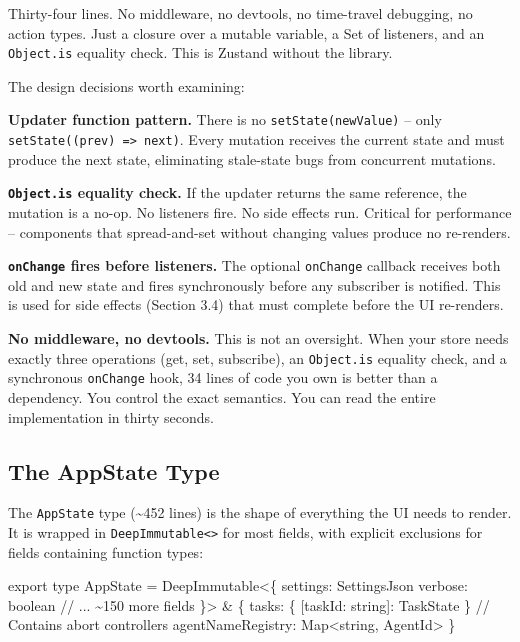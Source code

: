 \documentclass[
  english,
  11pt,
  letterpaper,
]{book}
\newenvironment{Shaded}{\begin{snugshade}}{\end{snugshade}}
\newcommand{\BuiltInTok}[1]{\textcolor[rgb]{0.00,0.23,0.31}{#1}}
\newcommand{\CommentTok}[1]{\textcolor[rgb]{0.37,0.37,0.37}{#1}}
\newcommand{\DataTypeTok}[1]{\textcolor[rgb]{0.68,0.00,0.00}{#1}}
\newcommand{\ImportTok}[1]{\textcolor[rgb]{0.00,0.46,0.62}{#1}}
\newcommand{\NormalTok}[1]{\textcolor[rgb]{0.00,0.23,0.31}{#1}}
\newcommand{\OperatorTok}[1]{\textcolor[rgb]{0.37,0.37,0.37}{#1}}
\begin{document}
Thirty-four lines. No middleware, no devtools, no time-travel debugging,
no action types. Just a closure over a mutable variable, a Set of
listeners, and an \texttt{Object.is} equality check. This is Zustand
without the library.

The design decisions worth examining:

\textbf{Updater function pattern.} There is no
\texttt{setState(newValue)} -- only
\texttt{setState((prev)\ =\textgreater{}\ next)}. Every mutation
receives the current state and must produce the next state, eliminating
stale-state bugs from concurrent mutations.

\textbf{\texttt{Object.is} equality check.} If the updater returns the
same reference, the mutation is a no-op. No listeners fire. No side
effects run. Critical for performance -- components that spread-and-set
without changing values produce no re-renders.

\textbf{\texttt{onChange} fires before listeners.} The optional
\texttt{onChange} callback receives both old and new state and fires
synchronously before any subscriber is notified. This is used for side
effects (Section 3.4) that must complete before the UI re-renders.

\textbf{No middleware, no devtools.} This is not an oversight. When your
store needs exactly three operations (get, set, subscribe), an
\texttt{Object.is} equality check, and a synchronous \texttt{onChange}
hook, 34 lines of code you own is better than a dependency. You control
the exact semantics. You can read the entire implementation in thirty
seconds.

\subsection{The AppState Type}\label{the-appstate-type}

The \texttt{AppState} type (\textasciitilde452 lines) is the shape of
everything the UI needs to render. It is wrapped in
\texttt{DeepImmutable\textless{}\textgreater{}} for most fields, with
explicit exclusions for fields containing function types:

\begin{Shaded}
\begin{Highlighting}[]
\ImportTok{export type}\NormalTok{ AppState }\OperatorTok{=}\NormalTok{ DeepImmutable}\OperatorTok{\textless{}}\NormalTok{\{}
\NormalTok{  settings}\OperatorTok{:}\NormalTok{ SettingsJson}
\NormalTok{  verbose}\OperatorTok{:} \DataTypeTok{boolean}
  \CommentTok{// ... \textasciitilde{}150 more fields}
\NormalTok{\}}\OperatorTok{\textgreater{}} \OperatorTok{\&}\NormalTok{ \{}
\NormalTok{  tasks}\OperatorTok{:}\NormalTok{ \{ [taskId}\OperatorTok{:} \DataTypeTok{string}\NormalTok{]}\OperatorTok{:}\NormalTok{ TaskState \}  }\CommentTok{// Contains abort controllers}
\NormalTok{  agentNameRegistry}\OperatorTok{:} \BuiltInTok{Map}\OperatorTok{\textless{}}\DataTypeTok{string}\OperatorTok{,}\NormalTok{ AgentId}\OperatorTok{\textgreater{}}
\NormalTok{\}}
\end{Highlighting}
\end{Shaded}
\end{document}
